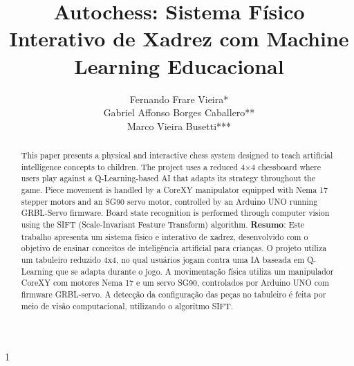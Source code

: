 \documentclass[a4paper]{ifacconf}
\def\portugues{1}
\def\portugues{0}
\begin{document}
	
	
\if\portugues1

% 
	
\begin{frontmatter}

\title{Autochess: Sistema Físico Interativo de Xadrez com Machine Learning Educacional} 



\author{\centering\parbox{7cm}{\centering
Fernando Frare Vieira*\\
Gabriel Affonso Borges Caballero**\\
Marco Vieira Busetti***}}

\address{*Engenharia de Computação, Universidade Tecnológica Federal do Paraná, (e-mail: fernandofrarevieira@alunos.utfpr.edu.br)\\
**Engenharia de Computação, Universidade Tecnológica Federal do Paraná, (e-mail: gabrielaffonso@alunos.utfpr.edu.br)\\
***Engenharia Elétrica, Universidade Tecnológica Federal do Paraná, (e-mail: marcovieirabusetti@alunos.utfpr.edu.br)}

\renewcommand{\abstractname}{{\bf Abstract:~}}
\begin{abstract}              
This paper presents a physical and interactive chess system designed to teach artificial intelligence concepts to children. The project uses a reduced 4×4 chessboard where users play against a Q-Learning-based AI that adapts its strategy throughout the game. Piece movement is handled by a CoreXY manipulator equipped with Nema 17 stepper motors and an SG90 servo motor, controlled by an Arduino UNO running GRBL-Servo firmware. Board state recognition is performed through computer vision using the SIFT (Scale-Invariant Feature Transform) algorithm.
\vskip 1mm%
{\noindent \bf Resumo}: Este trabalho apresenta um sistema físico e interativo de xadrez, desenvolvido com o objetivo de ensinar conceitos de inteligência artificial para crianças. O projeto utiliza um tabuleiro reduzido 4x4, no qual usuários jogam contra uma IA baseada em Q-Learning que se adapta durante o jogo. A movimentação física utiliza um manipulador CoreXY com motores Nema 17 e um servo SG90, controlados por Arduino UNO com firmware GRBL-servo. A detecção da configuração das peças no tabuleiro é feita por meio de visão computacional, utilizando o algoritmo SIFT.
\end{abstract}


\end{frontmatter}
\end{document}
